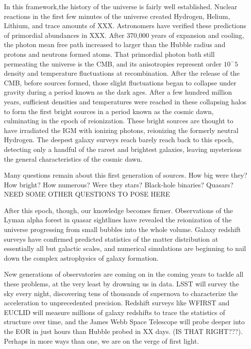 In this framework,the history of the universe is fairly well established. Nuclear reactions in the first few minutes of the universe created Hydrogen, Helium, Lithium, and trace amounts of XXX. Astronomers have verified these predictions of primordial abundances in XXX. After 370,000 years of expansion and cooling, the photon mean free path increased to larger than the Hubble radius and protons and neutrons formed atoms. That primordial photon bath still permeating the universe is the CMB, and its anisotropies represent order $10^-5$ density and temperature fluctuations at recombination. After the release of the CMB, before sources formed, those slight fluctuations began to collapse under gravity during a period known as the dark ages. After a few hundred million years, sufficient densities and temperatures were reached in these collapsing halos to form the first bright sources in a period known as the cosmic dawn, culminating in the epoch of reionization. These bright sources are thought to have irradiated the IGM with ionizing photons, reionizing the formerly neutral Hydrogen. The deepest galaxy surveys reach barely reach back to this epoch, detecting only a handful of the rarest and brightest galaxies, leaving mysterious the general characteristics of the cosmic dawn.

Many questions remain about this first generation of sources. How big were they? How bright? How numerous? Were they stars? Black-hole binaries? Quasars? NEED SOME OTHER QUESTIONS TO POSE HERE

After this epoch, though, our knowledge becomes firmer. Observations of the Lyman alpha forest in quasar sightlines have revealed the reionization of the universe progressing from small bubbles into the whole volume. Galaxy redshift surveys have confirmed predicted statistics of the matter distribution at essentially all but galactic scales, and numerical simulations are beginning to nail down the complex astrophysics of galaxy formation.

New generations of observatories are coming on in the coming years to tackle all these problems, at the very least by drowning us in data. LSST will survey the sky every night, discovering tens of thousands of supernova to characterize the acceleration to unprecedented precision. Redshift surveys like WFIRST and EUCLID will measure millions of galaxy redshifts to trace the statistics of structure over time, and the James Webb Space Telescope will probe deeper into the EOR in just hours than Hubble probed in XX days. (IS THAT RIGHT???). Perhaps in more ways than one, we are on the verge of first light.

